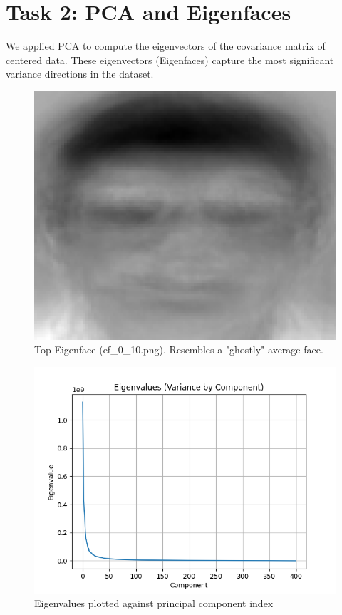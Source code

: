 \documentclass[conference]{IEEEtran}
\begin{document}
\section{Task 2: PCA and Eigenfaces}
We applied PCA to compute the eigenvectors of the covariance matrix of centered data. These eigenvectors (Eigenfaces) capture the most significant variance directions in the dataset.

\begin{figure}[htbp]
\centering
\includegraphics[width=\linewidth]{eigenfaces/ef_0_10.png}
\caption{Top Eigenface (ef\_0\_10.png). Resembles a "ghostly" average face.}
\end{figure}

\begin{figure}[htbp]
\centering
\includegraphics[width=\linewidth]{eigenvalues.png}
\caption{Eigenvalues plotted against principal component index}
\end{figure}
\end{document}
